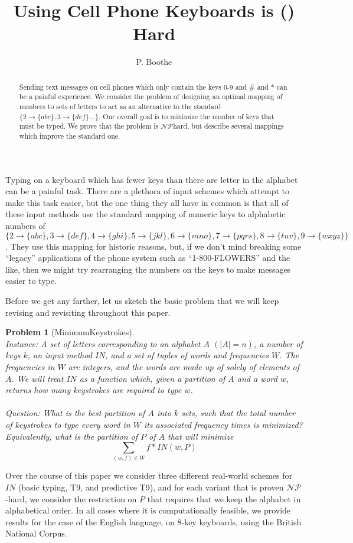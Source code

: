 \documentclass{article}
\title{Using Cell Phone Keyboards is (\NP) Hard}
\author{P. Boothe}
\newtheorem{problem}{Problem}
\newcommand{\NP}{\ensuremath{\mathcal{NP}}}
\begin{document}
\maketitle

\begin{abstract}
Sending text messages on cell phones which only contain the keys 0-9 and
\# and * can be a painful experience.  We consider the problem of
designing an optimal mapping of numbers to sets of letters to act as an
alternative to the standard $\{2\to\{abc\}, 3\to\{def\}\ldots\}$.  Our
overall goal is to minimize the number of keys that must be typed.  We
prove that the problem is \NP hard, but describe several mappings which
improve the standard one.
\end{abstract}

Typing on a keyboard which has fewer keys than there are letter in
the alphabet can be a painful task.  There are a plethora of 
input schemes which attempt to make this task easier, but the one thing
they all have in common is that all of these input methods use the
standard mapping of numeric keys to alphabetic numbers of $\{2\to\{abc\},
         3\to\{def\}, 4\to\{ghi\}, 5\to\{jkl\}, 6\to\{mno\}, 7\to\{pqrs\},
         8\to\{tuv\}, 9\to\{wxyz\}\}$.  They use this mapping for historic
reasons, but, if we don't mind breaking some ``legacy'' applications of the
phone system such as ``1-800-FLOWERS'' and the like, then we might try
rearranging the numbers on the keys to make messages easier to type.

Before we get any farther, let us sketch the basic problem that we will keep
revising and revisiting throughout this paper.
\begin{problem}[{\sc MinimumKeystrokes}]~\\
{\sc Instance}: A set of letters corresponding to an alphabet $A$ $(|A| =
n)$, a number of keys $k$, an input method $IN$, and a set of
tuples of words and frequencies $W$.  The frequencies in $W$ are integers,
and the words are made up of solely of elements of $A$.  We will
treat $IN$ as a function which, given a partition of $A$ and a word
$w$, returns how many keystrokes are required to type $w$.~\\
        ~\\
{\sc Question}: What is the best partition of $A$ into $k$ sets, such that the
total number of keystrokes to type every word in $W$ its associated frequency
times is minimized?  Equivalently, what is the partition of $P$ of $A$ that
will minimize
$$\sum_{(w,f)\in W} f*IN(w,P)$$
\end{problem}

Over the course of this paper we consider three different real-world
schemes for $IN$ (basic typing, T9, and predictive T9), and for each
variant that is proven \NP-hard, we consider the restriction on $P$ that
requires that we keep the alphabet in alphabetical order.  In all cases
where it is computationally feasible, we provide results for the case of
the English language, on 8-key keyboards, using the British National
Corpus\cite{bnc}.  



\end{document}
